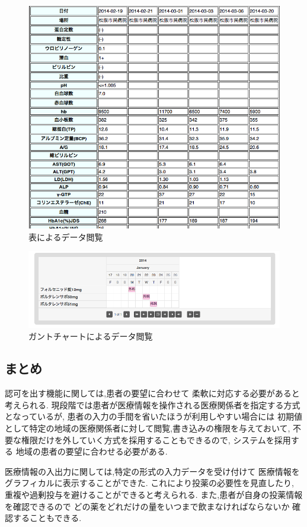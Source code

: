     \begin{figure}[htbp]
        \includegraphics[width=15cm, bb=0 0 698 621]{./gazou/DjangoTable2.png}
      \caption{表によるデータ閲覧}
      \label{DjangoTable}
    \end{figure}

    \begin{figure}[htbp]
        \includegraphics[width=15cm, bb=0 0 835 221]{./gazou/DjangoGantt2.png}
      \caption{ガントチャートによるデータ閲覧}
      \label{DjangoGantt}
    \end{figure}



\subsection{まとめ}
  認可を出す機能に関しては,患者の要望に合わせて
  柔軟に対応する必要があると考えられる.
  現段階では患者が医療情報を操作される医療関係者を指定する方式となっているが,
  患者の入力の手間を省いたほうが利用しやすい場合には
  初期値として特定の地域の医療関係者に対して閲覧,書き込みの権限を与えておいて,
  不要な権限だけを外していく方式を採用することもできるので,
  システムを採用する
  地域の患者の要望に合わせる必要がある.


  医療情報の入出力に関しては,特定の形式の入力データを受け付けて
  医療情報をグラフィカルに表示することができた.
  これにより投薬の必要性を見直したり,
  重複や過剰投与を避けることができると考えられる.
  また,患者が自身の投薬情報を確認できるので
  どの薬をどれだけの量をいつまで飲まなければならないか
  確認することもできる.
